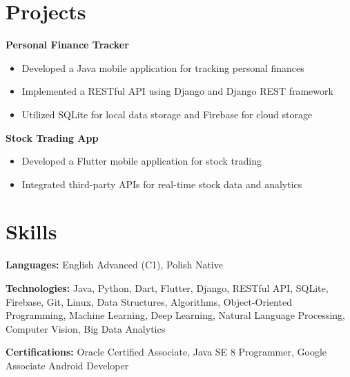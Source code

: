 \documentclass[10pt, letterpaper]{article}
\begin{document}
\section*{Projects}

\noindent\textbf{Personal Finance Tracker}

\vspace{5pt}
\begin{itemize}
    
    \item Developed a Java mobile application for tracking personal finances
    
    \item Implemented a RESTful API using Django and Django REST framework
    
    \item Utilized SQLite for local data storage and Firebase for cloud storage
    
\end{itemize}

\noindent\textbf{Stock Trading App}

\vspace{5pt}
\begin{itemize}
    
    \item Developed a Flutter mobile application for stock trading
    
    \item Integrated third-party APIs for real-time stock data and analytics
    
\end{itemize}


\section*{Skills}
\noindent\textbf{Languages:} 
English Advanced (C1), Polish Native
\vspace{5pt}

\noindent\textbf{Technologies:}
Java, Python, Dart, Flutter, Django, RESTful API, SQLite, Firebase, Git, Linux, Data Structures, Algorithms, Object-Oriented Programming, Machine Learning, Deep Learning, Natural Language Processing, Computer Vision, Big Data Analytics
\vspace{5pt}

\noindent\textbf{Certifications:}
Oracle Certified Associate, Java SE 8 Programmer, Google Associate Android Developer
\end{document}
